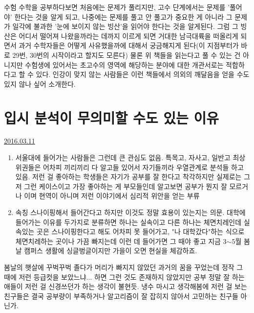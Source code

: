 수험 수학을 공부하다보면 처음에는 문제가 풀리지만, 고수 단계에서는 문제를 '풀어야' 한다는 것을 알게 되고,
나중에는 문제를 풀고 안 풀고가 중요한 게 아니라 그 문제가 일각에 불과한 '눈에 보이지 않는 빙산'을 읽어야 한다는 것을 알게된다.
그럼 그 빙산은 어디서 떨어져 나왔을까라는 데까지 이르게 되면 거대한 남극대륙을 떠올리게 되면서
과거 수학자들은 어떻게 사유했을까에 대해서 궁금해지게 된다(이 지점부터가 바로 29번, 30번의 시작이라고 할지도 모른다)
물론 위 책들을 읽는다고 풀 수 있는 건 아니지만 수험생에 있어서는 초고수의 영역에 해당하는 분야에 대한 개관서로는 적합하다고 할 수 있다.
인강이 맞지 않는 사람들은 이런 책들에서 의외의 깨달음을 얻을 수도 있지 않나 싶어 소개한다.
\vspace{5mm}







\section{입시 분석이 무의미할 수도 있는 이유}
\href{https://www.kockoc.com/Apoc/673033}{2016.03.11}

\vspace{5mm}


\begin{enumerate}
    \item 서울대에 들어가는 사람들은 그런데 큰 관심도 없음.
    특목고, 자사고, 일반고 최상위권들은 어차피 끼리끼리 다 알고들 있어서 자기들끼라 우열관계로 분석들 하고 있음.
    저런 걸 좋아하는 학생들은 자기가 공부를 잘 한다고 착각하지만 실제로는 그저 그런 케이스이고
    가장 좋아하는 게 부모들인데 알고보면 공부가 뭔지 잘 모르거나 이며 현역이 아니며 저런 이야기에서 심리적 위안을 얻는 부류
    \vspace{5mm}
    
    \item 속칭 스나이핑해서 들어간다고 하지만 이것도 정말 효용이 있는지는 의문.
    대학에 들어가는 이유를 두가지로 분류하면 하나는 실속이고 다른 하나는 체면치레인데
    실속있는 곳은 스나이핑한다고 해도 어차피 못 들어가고, "나 대학갔다"하는 식으로 체면치레하는 곳이나 가끔 빠지는데
    이런 데 들어가면 그 때야 좋고 지금 3$\sim$5월 봄날 캠퍼스 생활에 싱글벙글이지만 가을이 오면 현실을 체감하죠.
    \vspace{5mm}
\end{enumerate}

봄날의 햇살에 꾸벅꾸벅 졸다가 머리가 빠지지 않았던 과거의 꿈을 꾸었는데
정작 그 때에 저런 등급컷을 보았느냐... 하면 그런 것도 존재하지 않았지만 공부 정말 잘 하는 애들이 저런 걸 신경쓰던가 하는 생각이 불현듯.
냉수 마시고 생각해봄에 저런 걸 보는 친구들은 결국 공부량이 부족하거나 알고리즘이 잘 잡히지 않아서 고민하는 친구들 아닌가.
\vspace{5mm}

